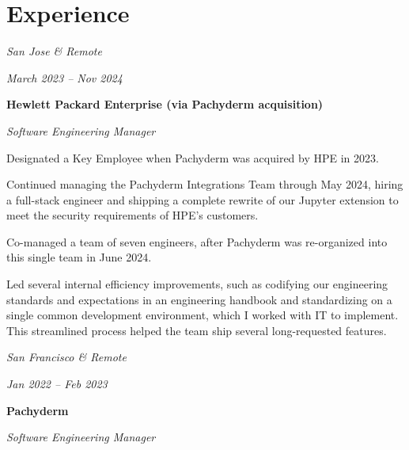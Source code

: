 \documentclass[10pt, letterpaper]{article}
\begin{document}
\section{Experience}

\begin{twocolentry}{
    \textit{San Jose \& Remote}

    \textit{March 2023 – Nov 2024}
}
    \textbf{Hewlett Packard Enterprise (via Pachyderm acquisition)}

    \textit{Software Engineering Manager}
\end{twocolentry}

\vspace{0.1 cm}

\begin{onecolentry}
    \begin{highlights}
        \item Designated a Key Employee when Pachyderm was acquired by HPE in 2023.
        \item Continued managing the Pachyderm Integrations Team through May 2024, hiring a full-stack engineer and shipping a complete rewrite of our Jupyter extension to meet the security requirements of HPE's customers.
        \item Co-managed a team of seven engineers, after Pachyderm was re-organized into this single team in June 2024.
        \item Led several internal efficiency improvements, such as codifying our engineering standards and expectations in an engineering handbook and standardizing on a single common development environment, which I worked with IT to implement. This streamlined process helped the team ship several long-requested features.
    \end{highlights}
\end{onecolentry}

\vspace{0.2 cm}

\begin{twocolentry}{
    \textit{San Francisco \& Remote}

    \textit{Jan 2022 – Feb 2023}
}
    \textbf{Pachyderm}

    \textit{Software Engineering Manager}
\end{twocolentry}
\end{document}
